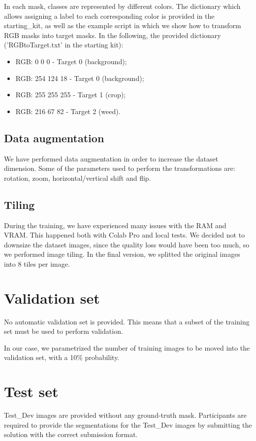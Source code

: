 \documentclass[12pt,a4paper]{report}
\begin{document}
In each mask, classes are represented by different colors. The dictionary which allows assigning a label to each corresponding color is provided in the starting\_kit, as well as the example script in which we show how to transform RGB masks into target masks. In the following, the provided dictionary ('RGBtoTarget.txt' in the starting kit):
			\begin{itemize}
				\item RGB: 0 0 0 - Target 0 (background);
				\item RGB: 254 124 18 - Target 0 (background);
				\item RGB: 255 255 255 - Target 1 (crop);
				\item RGB: 216 67 82 - Target 2 (weed).
			\end{itemize}

	\subsection{Data augmentation}
We have performed data augmentation in order to increase the dataset dimension. Some of the parameters used to perform the transformations are: rotation, zoom, horizontal/vertical shift and flip.

	\subsection{Tiling}
During the training, we have experienced many issues with the RAM and VRAM. This happened both with Colab Pro and local tests. We decided not to downsize the dataset images, since the quality loss would have been too much, so we performed image tiling. In the final version, we splitted the original images into 8 tiles per image.

	\section{Validation set}

No automatic validation set is provided. This means that a subset of the training set must be used to perform validation.

In our case, we parametrized the number of training images to be moved into the validation set, with a 10\% probability.


	\section{Test set}
Test\_Dev images are provided without any ground-truth mask. Participants are required to provide the segmentations for the Test\_Dev images by submitting the solution with the correct submission format. 
\end{document}
